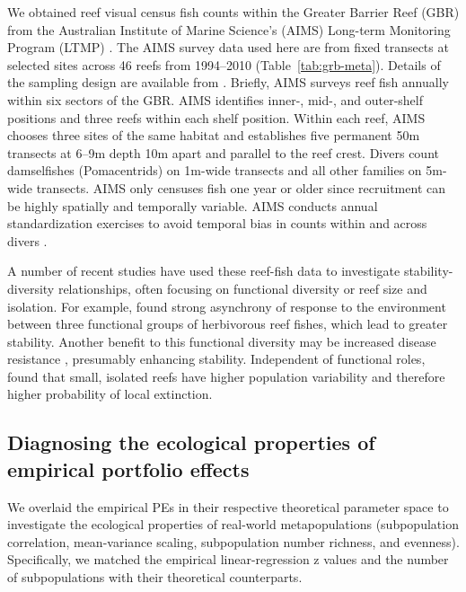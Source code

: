 We obtained reef visual census fish counts within the Greater Barrier Reef
(GBR) from the Australian Institute of Marine Science's (AIMS) Long-term
Monitoring Program (LTMP) \citep{sweatman2008}. The AIMS survey data used
here are from fixed transects at selected sites across 46 reefs from
1994--2010 (Table~\ref{tab:grb-meta}). Details of the sampling design are
available from \citet{halford1994}. Briefly, AIMS surveys reef fish
annually within six sectors of the GBR. AIMS identifies inner-, \mbox{mid-,}
and outer-shelf positions and three reefs within each shelf position. Within
each reef, AIMS chooses three sites of the same habitat and establishes five
permanent 50m transects at 6--9m depth 10m apart and parallel to the reef
crest. Divers count damselfishes (Pomacentrids) on 1m-wide transects and all
other families on 5m-wide transects. AIMS only censuses fish one year or older
since recruitment can be highly spatially and temporally variable. AIMS
conducts annual standardization exercises to avoid temporal bias in counts
within and across divers \citep{halford1994}.

A number of recent studies have used these reef-fish data to
investigate stability-diversity relationships, often focusing on functional
diversity or reef size and isolation. For example, \citet{thibaut2012}
found strong asynchrony of response to the environment between three functional
groups of herbivorous reef fishes, which lead to greater stability. Another
benefit to this functional diversity may be increased disease resistance
\citep{raymundo2009}, presumably enhancing stability. Independent of
functional roles, \citet{mellin2010} found that small, isolated reefs have
higher population variability and therefore higher probability of local
extinction.

\subsection{Diagnosing the ecological properties of empirical portfolio effects}

We overlaid the empirical PEs in their respective theoretical parameter space
to investigate the ecological properties of real-world metapopulations
(subpopulation correlation, mean-variance scaling, subpopulation number
richness, and evenness). Specifically, we matched the empirical
linear-regression z values and the number of subpopulations with their
theoretical counterparts.

